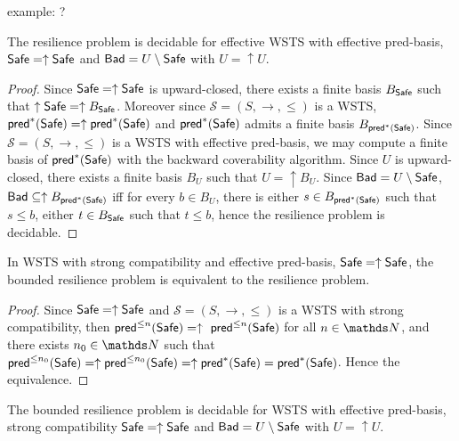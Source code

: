 example: ?


\begin{theorem}\label{up-up}
The resilience problem is decidable for effective WSTS with effective pred-basis, $\textsf{Safe}=\uparrow \textsf{Safe}$
and $\textsf{Bad}= U \setminus \textsf{Safe}$ with $U = \uparrow U$.
\end{theorem}


\begin{proof}
Since $\textsf{Safe}=\uparrow \textsf{Safe}$ is upward-closed, there exists a finite basis $B_{ \textsf{Safe}}$ such that $\uparrow \textsf{Safe} = \uparrow B_{\textsf{Safe}}$. 
Moreover since $\mathscr{S}=(S,\rightarrow,\leq)$ is a WSTS,  $\textsf{pred}^*(\textsf{Safe})=\uparrow \textsf{pred}^*(\textsf{Safe})$ and $\textsf{pred}^*(\textsf{Safe})$ admits a finite basis $B_{\textsf{pred}^*(\textsf{Safe})}$. Since $\mathscr{S}=(S,\rightarrow,\leq)$ is a WSTS  with effective pred-basis, we may compute a finite basis of $\textsf{pred}^*(\textsf{Safe})$ with the backward coverability algorithm. 
Since $U$  is upward-closed, there exists a finite basis $B_{U}$ such that $U = \uparrow B_{U}$. %
Since $\textsf{Bad} = U \setminus \textsf{Safe}$, $\textsf{Bad} \subseteq \uparrow B_{\textsf{pred}^*(\textsf{Safe})}$ iff for every $b \in B_{U}$, there is either $s \in B_{\textsf{pred}^*(\textsf{Safe})}$ such that $s \leq b$, either $t \in B_{\textsf{Safe}}$ such that $t\leq b$,
hence the resilience problem is decidable.
\end{proof}

\begin{proposition}
In WSTS with strong compatibility and effective pred-basis,  $\textsf{Safe}=\uparrow \textsf{Safe}$, the bounded resilience problem is equivalent to the resilience problem.
\end{proposition}

\begin{proof}
Since $\textsf{Safe}=\uparrow \textsf{Safe}$ and
$\mathscr{S}=(S,\rightarrow,\leq)$ is a WSTS with strong %
compatibility, then $\textsf{pred}^{\leq n}(\textsf{Safe})= \uparrow~\textsf{pred}^{\leq n}(\textsf{Safe})$ for all $n \in \N$,
and there exists $n_0 \in \N$ such that 
$\textsf{pred}^{\leq n_0}(\textsf{Safe}) = \uparrow \textsf{pred}^{\leq n_0}(\textsf{Safe}) = \uparrow \textsf{pred}^*(\textsf{Safe}) = \textsf{pred}^*(\textsf{Safe})$.
Hence the equivalence.
\end{proof}

\begin{corollary}\label{B-up-up}
The bounded resilience problem is decidable for WSTS with effective pred-basis,
strong compatibility
 $\textsf{Safe}=\uparrow \textsf{Safe}$
and $\textsf{Bad}=U \setminus \textsf{Safe}$ with $U = \uparrow U$.
\end{corollary}


